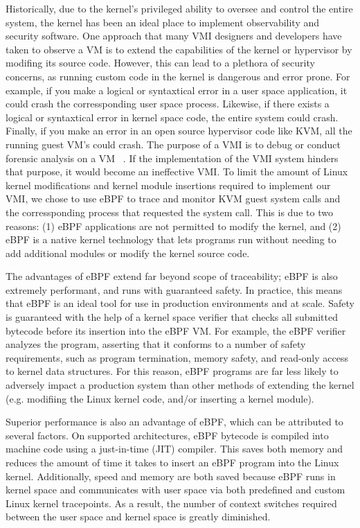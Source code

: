 \documentclass{report}
\begin{document}
\begin{spacing}{1.5}
{\large
Historically, due to the kernel’s privileged ability to oversee and control the entire system, the kernel has been an ideal place to implement observability and security software. One approach that many VMI designers and developers have taken to observe a VM is to extend the capabilities of the kernel or hypervisor by modifing its source code. However, this can lead to a plethora of security concerns, as running custom code in the kernel is dangerous and error prone. For example, if you make a logical or syntaxtical error in a user space application, it could crash the corressponding user space process. Likewise, if there exists a logical or syntaxtical error in kernel space code, the entire system could crash. Finally, if you make an error in an open source hypervisor code like KVM, all the running guest VM's could crash. The purpose of a VMI is to debug or conduct forensic analysis on a VM ~\cite{Payne2011}. If the implementation of the VMI system hinders that purpose, it would become an ineffective VMI. To limit the amount of Linux kernel modifications and kernel module insertions required to implement our VMI, we chose to use eBPF to trace and monitor KVM guest system calls and the corressponding process that requested the system call. This is due to two reasons: (1) eBPF applications are not permitted to modify the kernel, and (2) eBPF is a native kernel technology that lets programs run without needing to add additional modules or modify the kernel source code.
\newline
}

{\large
The advantages of eBPF extend far beyond scope of traceability; eBPF is also extremely performant, and runs with guaranteed safety. In practice, this means that eBPF is an ideal tool for use in production environments and at scale. Safety is guaranteed with the help of a kernel space verifier that checks all submitted bytecode before its insertion into the eBPF VM. For example, the eBPF verifier analyzes the program, asserting that it conforms to a number of safety requirements, such as program termination, memory safety, and read-only access to kernel data structures. For this reason, eBPF programs are far less likely to adversely impact a production system than other methods of extending the kernel (e.g. modifiing the Linux kernel code, and/or inserting a kernel module).
\newline
}

{\large
Superior performance is also an advantage of eBPF, which can be attributed to several factors. On supported architectures, eBPF bytecode is compiled into machine code using a just-in-time (JIT) compiler. This saves both memory and reduces the amount of time it takes to insert an eBPF program into the Linux kernel. Additionally, speed and memory are both saved because eBPF runs in kernel space and communicates with user space via both predefined and custom Linux kernel tracepoints. As a result, the number of context switches required between the user space and kernel space is greatly diminished.
\newline
}


\end{spacing}
\end{document}
